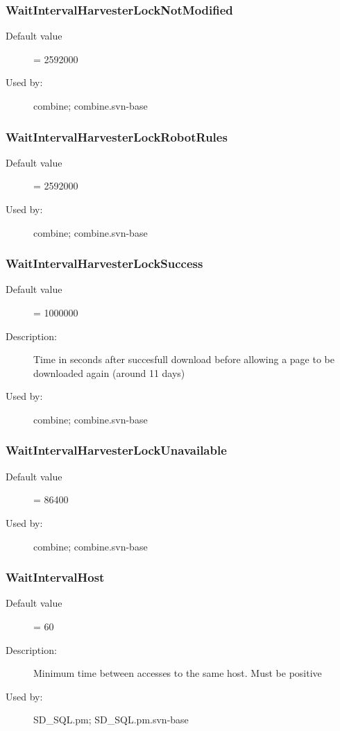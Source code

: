 \subsubsection{WaitIntervalHarvesterLockNotModified}
\label{WaitIntervalHarvesterLockNotModified}
\begin{description}
\item[Default value] = 2592000
\item[Used by:] combine; combine.svn-base
\end{description}
\subsubsection{WaitIntervalHarvesterLockRobotRules}
\label{WaitIntervalHarvesterLockRobotRules}
\begin{description}
\item[Default value] = 2592000
\item[Used by:] combine; combine.svn-base
\end{description}
\subsubsection{WaitIntervalHarvesterLockSuccess}
\label{WaitIntervalHarvesterLockSuccess}
\begin{description}
\item[Default value] = 1000000
\item[Description:] Time in seconds after succesfull download before allowing a page to be downloaded again (around 11 days)
\item[Used by:] combine; combine.svn-base
\end{description}
\subsubsection{WaitIntervalHarvesterLockUnavailable}
\label{WaitIntervalHarvesterLockUnavailable}
\begin{description}
\item[Default value] = 86400
\item[Used by:] combine; combine.svn-base
\end{description}
\subsubsection{WaitIntervalHost}
\label{WaitIntervalHost}
\begin{description}
\item[Default value] = 60
\item[Description:] Minimum time between accesses to the same host. Must be positive
\item[Used by:] SD\_SQL.pm; SD\_SQL.pm.svn-base
\end{description}
